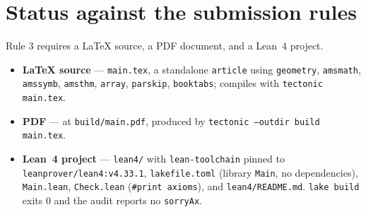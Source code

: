 \documentclass[11pt]{article}
\theoremstyle{definition}
\theoremstyle{remark}
\begin{document}
\section*{Status against the submission rules}

Rule 3 requires a LaTeX source, a PDF document, and a Lean~4 project.

\begin{itemize}
\item \textbf{LaTeX source} --- \texttt{main.tex}, a standalone \texttt{article}
  using \texttt{geometry}, \texttt{amsmath}, \texttt{amssymb}, \texttt{amsthm},
  \texttt{array}, \texttt{parskip}, \texttt{booktabs}; compiles with
  \texttt{tectonic main.tex}.
\item \textbf{PDF} --- at \texttt{build/main.pdf}, produced by
  \texttt{tectonic --outdir build main.tex}.
\item \textbf{Lean~4 project} --- \texttt{lean4/} with \texttt{lean-toolchain}
  pinned to \texttt{leanprover/lean4:v4.33.1}, \texttt{lakefile.toml}
  (library \texttt{Main}, no dependencies), \texttt{Main.lean},
  \texttt{Check.lean} (\texttt{\#print axioms}), and \texttt{lean4/README.md}.
  \texttt{lake build} exits $0$ and the audit reports no \texttt{sorryAx}.
\end{itemize}
\end{document}
